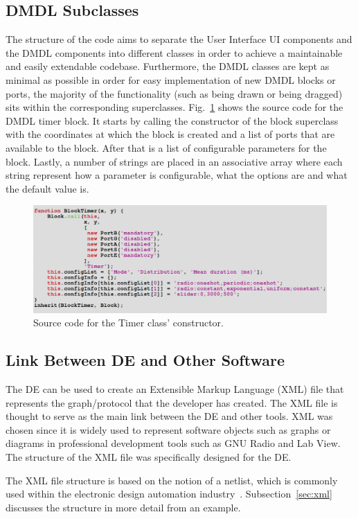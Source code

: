 \documentclass[journal,comsoc]{IEEEtran}
\begin{document}
\subsection{DMDL Subclasses}
The structure of the code aims to separate the User Interface UI components and the DMDL components
into different classes in order to achieve a maintainable and easily extendable codebase.
Furthermore, the DMDL classes are kept as minimal as possible in order for easy implementation
of new DMDL blocks or ports, the majority of the functionality (such as being drawn or being
dragged) sits within the corresponding superclasses. Fig.~\ref{fig:timer_src} shows the source code
for the DMDL timer block. It starts by calling the constructor of the block superclass with the
coordinates at which the block is created and a list of ports that are available to the block.
After that is a list of configurable parameters for the block. Lastly, a number of strings
are placed in an associative array where each string represent how a parameter is configurable,
what the options are and what the default value is.
\begin{figure}[!t]
\centering
    \includegraphics[width=\columnwidth]{timer_src.png}
    \caption{Source code for the Timer class' constructor.}
    \label{fig:timer_src}
\end{figure}

\subsection{Link Between DE and Other Software}
The DE can be used to create an Extensible Markup Language (XML) file that represents the
graph/protocol that the developer has created. The XML file is thought to serve as the main link
between the DE and other tools. XML was chosen since it is widely used to represent software
objects such as graphs or diagrams in professional development tools such as GNU Radio and
Lab View. The structure of the XML file was specifically designed for the DE.

The XML file structure is based on the notion of a netlist, which is commonly used within the
electronic design automation industry~\cite{netlist}. Subsection~\ref{sec:xml} discusses the
structure in more detail from an example.
\end{document}
